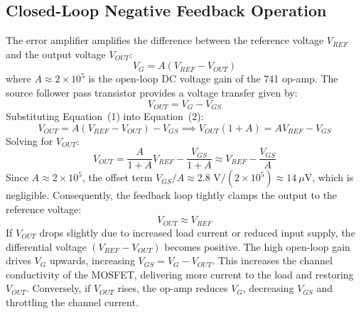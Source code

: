 \documentclass[11pt,a4paper]{article}
\begin{document}
\subsection{Closed-Loop Negative Feedback Operation}
The error amplifier amplifies the difference between the reference voltage $V_{REF}$ and the output voltage $V_{OUT}$:
\begin{equation}
    V_G = A \left( V_{REF} - V_{OUT} \right)
\end{equation}
where $A \approx 2 \times 10^5$ is the open-loop DC voltage gain of the 741 op-amp. The source follower pass transistor provides a voltage transfer given by:
\begin{equation}
    V_{OUT} = V_G - V_{GS}
\end{equation}
Substituting Equation~(1) into Equation~(2):
\begin{equation}
    V_{OUT} = A(V_{REF} - V_{OUT}) - V_{GS} \implies V_{OUT}(1 + A) = A V_{REF} - V_{GS}
\end{equation}
Solving for $V_{OUT}$:
\begin{equation}
    V_{OUT} = \frac{A}{1 + A} V_{REF} - \frac{V_{GS}}{1 + A} \approx V_{REF} - \frac{V_{GS}}{A}
\end{equation}
Since $A \approx 2 \times 10^5$, the offset term $V_{GS} / A \approx 2.8\text{ V} / (2 \times 10^5) \approx 14\ \mu\text{V}$, which is negligible. Consequently, the feedback loop tightly clamps the output to the reference voltage:
\begin{equation}
    V_{OUT} \approx V_{REF}
\end{equation}
If $V_{OUT}$ drops slightly due to increased load current or reduced input supply, the differential voltage $(V_{REF} - V_{OUT})$ becomes positive. The high open-loop gain drives $V_G$ upwards, increasing $V_{GS} = V_G - V_{OUT}$. This increases the channel conductivity of the MOSFET, delivering more current to the load and restoring $V_{OUT}$. Conversely, if $V_{OUT}$ rises, the op-amp reduces $V_G$, decreasing $V_{GS}$ and throttling the channel current.
\end{document}
